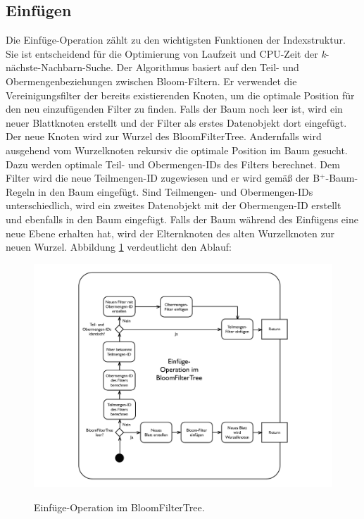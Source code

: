 \subsection{Einfügen}\label{sec:einfügen}
Die Einfüge-Operation zählt zu den wichtigsten Funktionen der Indexstruktur. Sie ist entscheidend für die Optimierung von Laufzeit und CPU-Zeit der \textit{k}-nächste-Nachbarn-Suche. Der Algorithmus basiert auf den Teil- und Obermengenbeziehungen zwischen Bloom-Filtern. Er verwendet die Vereinigungsfilter der bereits existierenden Knoten, um die optimale Position für den neu einzufügenden Filter zu finden. Falls der Baum noch leer ist, wird ein neuer Blattknoten erstellt und der Filter als erstes Datenobjekt dort eingefügt. Der neue Knoten wird zur Wurzel des BloomFilterTree. Andernfalls wird ausgehend vom Wurzelknoten rekursiv die optimale Position im Baum gesucht. Dazu werden optimale Teil- und Obermengen-IDs des Filters berechnet. Dem Filter wird die neue Teilmengen-ID zugewiesen und er wird gemäß der B$^+$-Baum-Regeln in den Baum eingefügt. Sind Teilmengen- und Obermengen-IDs unterschiedlich, wird ein zweites Datenobjekt mit der Obermengen-ID erstellt und ebenfalls in den Baum eingefügt. Falls der Baum während des Einfügens eine neue Ebene erhalten hat, wird der Elternknoten des alten Wurzelknoten zur neuen Wurzel. Abbildung \ref{fig:pic7} verdeutlicht den Ablauf:  
\begin{figure}[hpbt]
  \centering
 \includegraphics[scale=0.5]{pictures/insert-as-sets.pdf}\\
  \caption[Einfüge-Operation im BloomFilterTree]{Einfüge-Operation im BloomFilterTree.}\label{fig:pic7}
\end{figure}
